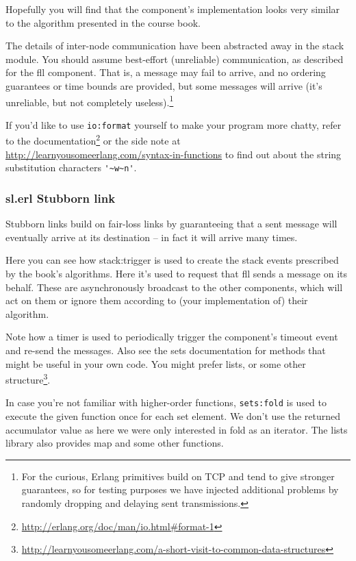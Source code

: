 \documentclass[a4paper]{article}
\begin{document}
Hopefully you will find that the component's implementation looks very
similar to the algorithm presented in the course book.


The details of inter-node communication have been abstracted away in the stack
module. You should assume best-effort (unreliable) communication, as described
for the fll component. That is, a message may fail to arrive, and no ordering
guarantees or time bounds are provided, but some messages will arrive (it's
unreliable, but not completely useless).\footnote{For the curious, Erlang
primitives build on TCP and tend to give stronger guarantees, so for testing
purposes we have injected additional problems by randomly dropping and
delaying sent transmissions.}

If you'd like to use \lstinline!io:format! yourself to make your program more
chatty, refer to the
documentation\footnote{\url{http://erlang.org/doc/man/io.html\#format-1}} or
the side note at \url{http://learnyousomeerlang.com/syntax-in-functions} to
find out about the string substitution characters \lstinline!'~w~n'!.


\subsubsection{sl.erl Stubborn link} %
\label{ssub:sl_erl_stubborn_link}

Stubborn links build on fair-loss links by guaranteeing that a sent message
will eventually arrive at its destination – in fact it will arrive many times.

Here you can see how stack:trigger is used to create the stack events
prescribed by the book's algorithms. Here it's used to request that fll sends
a message on its behalf. These are asynchronously broadcast to the other components,
which will act on them or ignore them according to (your implementation of)
their algorithm.

Note how a timer is used to periodically trigger the component's timeout event
and re-send the messages. Also see the sets documentation for methods that
might be useful in your own code. You might prefer lists, or some other
structure\footnote{\url{http://learnyousomeerlang.com/a-short-visit-to-common-data-structures}}.

In case you're not familiar with higher-order functions, \lstinline!sets:fold!
is used to execute the given function once for each set element. We don't use
the returned accumulator value as here we were only interested in fold as an
iterator. The lists library also provides map and some other functions.
\end{document}

